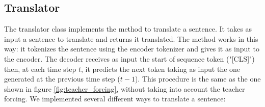\subsection{Translator}
The translator class implements the method to translate a sentence. It takes as input a sentence to translate and returns it translated. The method works in this way: it tokenizes the sentence using the encoder tokenizer and gives it as input to the encoder. The decoder receives as input the start of sequence token ("[CLS]") then, at each time step $t$, it predicts the next token taking as input the one generated at the previous time step ($t-1$). This procedure is the same as the one shown in figure \ref{fig:teacher_forcing}, without taking into account the teacher forcing. We implemented several different ways to translate a sentence:
